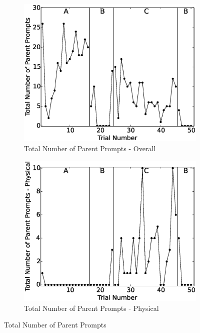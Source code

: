 \documentclass{ut-thesis}
\begin{document}
\begin{figure}[h]
	\centering
	\begin{subfigure}[b]{0.49\textwidth}
		\includegraphics[width=1.1\linewidth]{./img/data_analysis/25TotalNumberofParentPrompts.eps}
		\caption{Total Number of Parent Prompts - Overall}
		\label{fig:25TotalNumberofParentPrompts}
	\end{subfigure}
	\hfill
	\begin{subfigure}[b]{0.49\textwidth}
		\includegraphics[width=1.1\linewidth]{./img/data_analysis/26TotalNumberofParentPrompts-Physical.eps}
		\caption{Total Number of Parent Prompts - Physical}
		\label{fig:26TotalNumberofParentPrompts-Physical}
	\end{subfigure}%
	\caption{Total Number of Parent Prompts}
	\label{fig:TotalNumberOfParentPrompts}
\end{figure}
\end{document}
